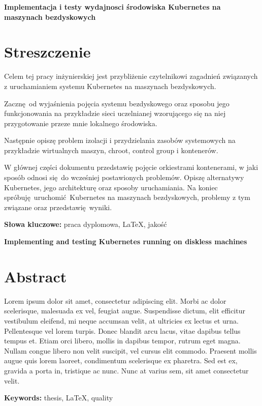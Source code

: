 \newpage
\begin{center}
  \large \bf
  Implementacja i testy wydajnosci środowiska Kubernetes na maszynach bezdyskowych
\end{center}

\section*{Streszczenie}

Celem tej pracy inżynierskiej jest przybliżenie czytelnikowi zagadnień
związanych z uruchamianiem systemu Kubernetes na maszynach bezdyskowych.

Zacznę od wyjaśnienia pojęcia systemu bezdyskowego oraz sposobu jego
funkcjonowania na przykładzie sieci uczelnianej wzorującego się na niej
przygotowanie przeze mnie lokalnego środowiska.

Następnie opiszę problem izolacji i przydzielania zasobów systemowych
na przykładzie wirtualnych maszyn, chroot, control group i kontenerów.

W głównej części dokumentu przedstawię pojęcie orkiestrami kontenerami,
w jaki sposób odnosi się do wcześniej postawionych problemów. Opiszę
alternatywy Kubernetes, jego architekturę oraz sposoby uruchamiania.
Na koniec spróbuję uruchomić Kubernetes na maszynach bezdyskowych,
problemy z tym związane oraz przedstawię wyniki.

\bigskip
{\noindent\bf Słowa kluczowe:} praca dyplomowa, LaTeX, jakość

\vskip 2cm


\begin{center}
  \large \bf
  Implementing and testing Kubernetes running on diskless machines
\end{center}

\section*{Abstract}

Lorem ipsum dolor sit amet, consectetur adipiscing elit.
Morbi ac dolor scelerisque, malesuada ex vel, feugiat augue.
Suspendisse dictum, elit efficitur vestibulum eleifend, mi neque
accumsan velit, at ultricies ex lectus et urna. Pellentesque vel
lorem turpis. Donec blandit arcu lacus, vitae dapibus tellus tempus et.
Etiam orci libero, mollis in dapibus tempor, rutrum eget magna.
Nullam congue libero non velit suscipit, vel cursus elit commodo.
Praesent mollis augue quis lorem laoreet, condimentum scelerisque ex pharetra.
Sed est ex, gravida a porta in, tristique ac nunc. Nunc at varius sem, sit amet consectetur velit.

\bigskip
{\noindent\bf Keywords:} thesis, LaTeX, quality

\vfill